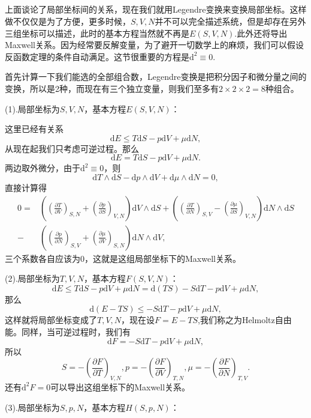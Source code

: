 \documentclass[10pt]{book}
\theoremstyle{plain}%
\begin{document}
\subsection{}
上面谈论了局部坐标间的关系，现在我们就用Legendre变换来变换局部坐标。这样做不仅仅是为了方便，更多时候，$S,V,N$并不可以完全描述系统，但是却存在另外三组坐标可以描述，此时的基本方程当然就不再是$E(S,V,N)$.此外还将导出Maxwell关系。因为经常要反解变量，为了避开一切数学上的麻烦，我们可以假设反函数定理的条件自动满足。这节很重要的方程是$\mathrm{d}^2\equiv 0$.

首先计算一下我们能选的全部组合数，Legendre变换是把积分因子和微分量之间的变换，所以是2种，而现在有三个独立变量，则我们至多有$2\times2\times2=8$种组合。

{\kaishu (1).局部坐标为$S,V,N$，基本方程$E(S,V,N)$}：

这里已经有关系
\[
\mathrm{d}E\leq T\mathrm{d}S-p\mathrm{d}V+\mu\mathrm{d}N,
\]
从现在起我们只考虑可逆过程。那么
\[
\mathrm{d}E= T\mathrm{d}S-p\mathrm{d}V+\mu\mathrm{d}N.
\]
两边取外微分，由于$\mathrm{d}^2\equiv 0$，则
\[
\mathrm{d}T\wedge \mathrm{d}S-\mathrm{d}p\wedge\mathrm{d}V+\mathrm{d}\mu\wedge\mathrm{d}N=0,
\]
直接计算得
\[
\begin{split}
0=&\left(\left(\frac{\partial T}{\partial V}\right)_{S,N}+\left(\frac{\partial p}{\partial S}\right)_{V,N}\right)\mathrm{d}V\wedge \mathrm{d}S
+\left(\left(\frac{\partial T}{\partial N}\right)_{S,V}-\left(\frac{\partial \mu}{\partial S}\right)_{V,N}\right)\mathrm{d}N\wedge \mathrm{d}S\\
-&\left(\left(\frac{\partial p}{\partial N}\right)_{S,V}+\left(\frac{\partial \mu}{\partial V}\right)_{S,N}\right)\mathrm{d}N\wedge \mathrm{d}V,
\end{split}
\]
三个系数各自应该为0，这就是这组局部坐标下的Maxwell关系。

{\kaishu (2).局部坐标为$T,V,N$，基本方程$F(S,V,N)$}：
\[
\mathrm{d}E \leq T\mathrm{d}S-p\mathrm{d}V+\mu\mathrm{d}N=\mathrm{d}(TS)-S\mathrm{d}T-p\mathrm{d}V+\mu\mathrm{d}N,
\]
那么
\[
\mathrm{d}(E-TS)\leq -S\mathrm{d}T-p\mathrm{d}V+\mu\mathrm{d}N,
\]
这样就将局部坐标变成了$T,V,N$，现在设$F=E-TS$,我们称之为Helmoltz自由能。同样，当可逆过程时，我们有
\[
\mathrm{d}F= -S\mathrm{d}T-p\mathrm{d}V+\mu\mathrm{d}N,
\]
所以
\[
	S=-\left(\frac{\partial F}{\partial T}\right)_{V,N},
	p=-\left(\frac{\partial F}{\partial V}\right)_{T,N},
	\mu=-\left(\frac{\partial F}{\partial N}\right)_{T,V}.
\]
还有$\mathrm{d}^2F=0$可以导出这组坐标下的Maxwell关系。

{\kaishu (3).局部坐标为$S,p,N$，基本方程$H(S,p,N)$}：
\end{document}
